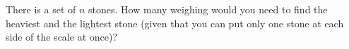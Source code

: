 There is a set of $n$ stones. How many weighing would you need to find the heaviest and the lightest
stone (given that you can put only one stone at each side of the scale at once)?
